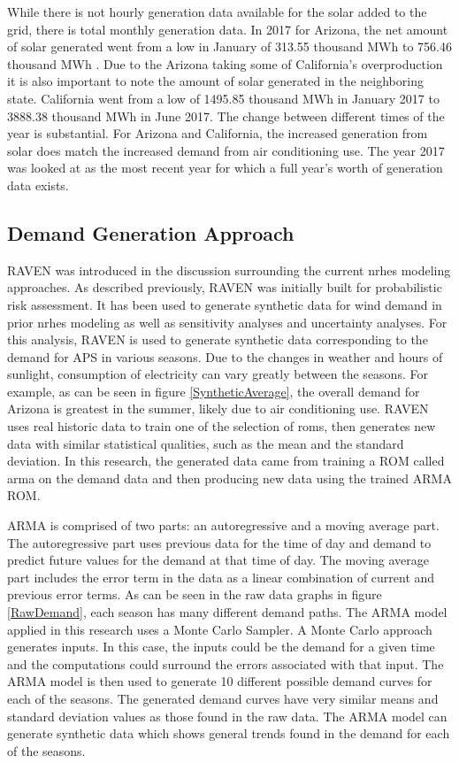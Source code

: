 While there is not hourly generation data available for the solar added to the grid, there is total monthly generation data. In 2017 for Arizona, the net amount of solar generated went from a low in January of 313.55 thousand MWh to 756.46 thousand MWh \cite{Eia2018}.  Due to the Arizona taking some of California's overproduction it is also important to note the amount of solar generated in the neighboring state.  California went from a low of 1495.85 thousand MWh in January 2017 to 3888.38 thousand MWh in June 2017\cite{Eia2018}. The change between different times of the year is substantial. For Arizona and California, the increased generation from solar does match the increased demand from air conditioning use. The year 2017 was looked at as the most recent year for which a full year's worth of generation data exists.

\subsection{Demand Generation Approach}
RAVEN was introduced in the discussion surrounding the current \ac{nrhes} modeling approaches.  As described previously, RAVEN was initially built for probabilistic risk assessment.  It has been used to generate synthetic data for wind demand in prior \ac{nrhes} modeling as well as sensitivity analyses and uncertainty analyses.  For this analysis, RAVEN is used to generate synthetic data corresponding to the demand for APS in various seasons.  Due to the changes in weather and hours of sunlight, consumption of electricity can vary greatly between the seasons. For example, as can be seen in figure \ref{SyntheticAverage}, the overall demand for Arizona is greatest in the summer, likely due to air conditioning use. RAVEN uses real historic data to train one of the selection of \ac{rom}s, then generates new data with similar statistical qualities, such as the mean and the standard deviation. In this research, the generated data came from training a ROM called \ac{arma} on the demand data and then producing new data using the trained ARMA ROM.

ARMA is comprised of two parts: an autoregressive and a moving average part.  The autoregressive part uses previous data for the time of day and demand to predict future values for the demand at that time of day. The moving average part includes the error term in the data as a linear combination of current and previous error terms. As can be seen in the raw data graphs in figure \ref{RawDemand}, each season has many different demand paths. The ARMA model applied in this research uses a Monte Carlo Sampler. A Monte Carlo approach generates inputs. In this case, the inputs could be the demand for a given time and the computations could surround the errors associated with that input. The ARMA model is then used to generate 10 different possible demand curves for each of the seasons.  The generated demand curves have very similar means and standard deviation values as those found in the raw data. The ARMA model can generate synthetic data which shows general trends found in the demand for each of the seasons.


